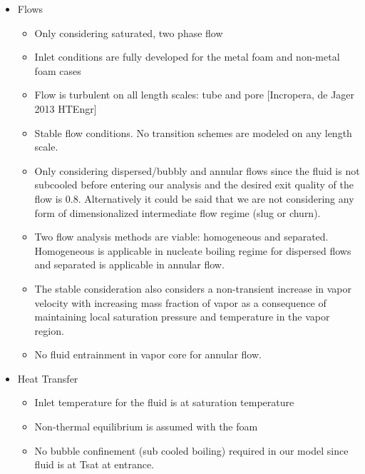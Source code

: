 \documentclass[compileTAMUreport.tex]{subfiles}
\begin{document}
\begin{itemize}
\item Flows
	\begin{itemize}
		\item 	Only considering saturated, two phase flow 
		\item 	Inlet conditions are fully developed for the metal foam and non-metal foam cases
		\item 	Flow is turbulent on all length scales: tube and pore [Incropera, de Jager 2013 HTEngr]
		\item 	Stable flow conditions. No transition schemes are modeled on any length scale.
		\item 	Only considering dispersed/bubbly and annular flows since the fluid is not subcooled before entering our analysis and the desired exit quality of the flow is 0.8. 
		Alternatively it could be said that we are not considering any form of dimensionalized intermediate flow regime (slug or churn).
		\item	Two flow analysis methods are viable: homogeneous and separated. 
		Homogeneous is applicable in nucleate boiling regime for dispersed flows and separated is applicable in annular flow.
		\item 	The stable consideration also considers a non-transient increase in vapor velocity with increasing mass fraction of vapor as a consequence of maintaining local saturation pressure and temperature in the vapor region.
		\item 	No fluid entrainment in vapor core for annular flow.
	\end{itemize}

\item Heat Transfer
	\begin{itemize}
		\item 	Inlet temperature for the fluid is at saturation temperature
		\item 	Non-thermal equilibrium is assumed with the foam
		\item 	No bubble confinement  (sub cooled boiling) required in our model since fluid is at Tsat at entrance.
	\end{itemize}
\end{itemize}
\end{document}

